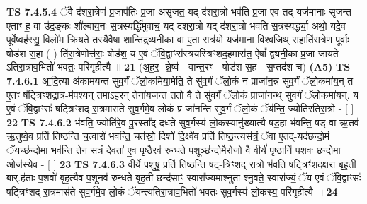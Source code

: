 \documentclass[17pt]{extarticle}
\begin{document}
                  \newline
                                \textbf{ TS 7.4.5.4} \newline
                  ॅवै द॑शरा॒त्रेण॑ प्र॒जाप॑तिः प्र॒जा अ॑सृजत॒ यद्-द॑शरा॒त्रो भव॑ति प्र॒जा ए॒व तद् यज॑मानाः सृजन्त ए॒ताꣳ ह॒ वा उ॑द॒ङ्कः शौ᳚ल्बाय॒नः स॒त्रस्यर्द्धि॑मुवाच॒ यद् द॑शरा॒त्रो यद् द॑शरा॒त्रो भव॑ति स॒त्रस्यर्द्ध्या॒ अथो॒ यदे॒व पूर्वे॒ष्वह॑स्सु॒ विलो॑म क्रि॒यते॒ तस्यै॒वैषा शान्ति॑द्र्व्यनी॒का वा ए॒ता रात्र॑यो॒ यज॑माना विश्व॒जिथ् स॒हाति॑रा॒त्रेण॒ पूर्वाः॒ षोड॑श स॒हा ( ) ति॑रा॒त्रेणोत्त॑राः॒ षोड॑श॒ य ए॒वं ॅवि॒द्वाꣳस॑स्त्रयस्त्रिꣳशद॒हमास॑त॒ ऐषां᳚ द्व्यनी॒का प्र॒जा जा॑यते ऽतिरा॒त्राव॒भितो॑ भवतः॒ परि॑गृहीत्यै ॥ \textbf{  21} \newline
                  \newline
                      (अ॒ह॒र॒- न्ने॒ष्व॑ - वान्त॒रꣳ - षोड॑श स॒ह - स॒प्तद॑श च)  \textbf{(A5)} \newline \newline
                                        \textbf{ TS 7.4.6.1} \newline
                  आ॒दि॒त्या अ॑कामयन्त सुव॒र्गं ॅलो॒कमि॑या॒मेति॒ ते सु॑व॒र्गं ॅलो॒कं न प्राजा॑न॒न्न सु॑व॒र्गं ॅलो॒कमा॑य॒न् त ए॒तꣳ ष॑ट्त्रिꣳशद्रा॒त्र-म॑पश्य॒न् तमाऽह॑र॒न् तेना॑यजन्त॒ ततो॒ वै ते सु॑व॒र्गं ॅलो॒कं प्राजा॑नन्थ् सुव॒र्गं ॅलो॒कमा॑य॒न्॒. य ए॒वं ॅवि॒द्वाꣳसः॑ षट्त्रिꣳशद् रा॒त्रमास॑ते सुव॒र्गमे॒व लोकं प्र जा॑नन्ति सुव॒र्गं ॅलो॒कं ॅय॑न्ति॒ ज्योति॑रतिरा॒त्रो - [  ] \textbf{  22} \newline
                  \newline
                                \textbf{ TS 7.4.6.2} \newline
                  भ॑वति॒ ज्योति॑रे॒व पु॒रस्ता᳚द् दधते सुव॒र्गस्य॑ लो॒कस्यानु॑ख्यात्यै षड॒हा भ॑वन्ति॒ षड् वा ऋ॒तव॑ ऋ॒तुष्वे॒व प्रति॑ तिष्ठन्ति च॒त्वारो॑ भवन्ति॒ चत॑स्रो॒ दिशो॑ दि॒क्ष्वे॑व प्रति॑ तिष्ठ॒न्त्यस॑त्रं॒ ॅवा ए॒तद्-यद॑छन्दो॒मं ॅयच्छ॑न्दो॒मा भव॑न्ति॒ तेन॑ स॒त्रं दे॒वता॑ ए॒व पृ॒ष्ठैरव॑ रुन्धते प॒शूञ्छ॑न्दो॒मैरोजो॒ वै वी॒र्यं॑ पृ॒ष्ठानि॑ प॒शवः॑ छन्दो॒मा ओज॑स्ये॒व - [  ] \textbf{  23} \newline
                  \newline
                                \textbf{ TS 7.4.6.3} \newline
                  वी॒र्ये॑ प॒शुषु॒ प्रति॑ तिष्ठन्ति षट्-त्रिꣳशद् रा॒त्रो भ॑वति॒ षट्त्रिꣳ॑शदक्षरा बृह॒ती बार्.ह॑ताः प॒शवो॑ बृह॒त्यैव प॒शूनव॑ रुन्धते बृह॒ती छन्द॑साꣳ॒॒ स्वारा᳚ज्यमाश्नुता-श्नु॒वते॒ स्वारा᳚ज्यं॒ ॅय ए॒वं ॅवि॒द्वाꣳसः॑ षट्त्रिꣳशद् रा॒त्रमास॑ते सुव॒र्गमे॒व लो॒कं ॅय॑न्त्यतिरा॒त्राव॒भितो॑ भवतः सुव॒र्गस्य॑ लो॒कस्य॒ परि॑गृहीत्यै ॥ \textbf{  24} \newline
\end{document}

